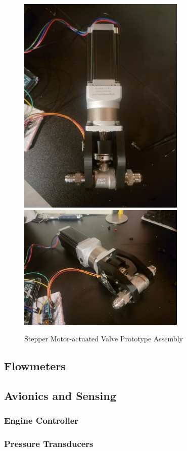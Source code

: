 \documentclass[12pt, letterpaper]{article}
\begin{document}
\begin{figure}[H]
    \centering
    \includegraphics[width=8cm]{Images/ValvePrototypeV1.jpg}
    \includegraphics[width=8cm]{Images/ValvePrototypeV1-2.jpg}
    \caption{Stepper Motor-actuated Valve Prototype Assembly}
\end{figure}

\subsection{Flowmeters}
\subsection{Avionics and Sensing}
\subsubsection{Engine Controller}
\subsubsection{Pressure Transducers}
\end{document}
